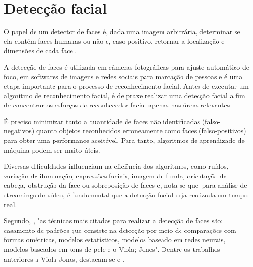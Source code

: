\chapter{Detecção facial}\label{cap:detecao_facial}


O papel de um detector de faces é, dada uma imagem arbitrária, determinar se ela contém faces humanas ou não e, caso positivo, retornar a localização e dimensões de cada face \cite{censtudy}.

A detecção de faces é utilizada em câmeras fotográficas para ajuste automático de foco, em softwares de imagens e redes sociais para marcação de pessoas e é uma etapa importante para o processo de reconhecimento facial. Antes de executar um algoritmo de reconhecimento facial, é de praxe realizar uma detecção facial a fim de concentrar os esforços do reconhecedor facial apenas nas áreas relevantes.

É preciso minimizar tanto a quantidade de faces não identificadas (falso-negativos) quanto objetos reconhecidos erroneamente como faces (falso-positivos) para obter uma performance aceitável. Para tanto, algoritmos de aprendizado de máquina podem ser muito úteis.

Diversas dificuldades influenciam na eficiência dos algoritmos, como ruídos, variação de iluminação, expressões faciais, imagem de fundo, orientação da cabeça, obstrução da face ou sobreposição de faces \cite{de2015processo} e, nota-se que, para análise de streamings de vídeo, é fundamental que a detecção facial seja realizada em tempo real.

Segundo, , "as técnicas mais citadas para realizar a detecção de faces são: casamento de padrões que consiste na detecção por meio de comparações com formas ométricas, modelos estatísticos, modelos baseado em redes neurais, modelos baseados em tons de pele e o Viola; Jones". Dentre os trabalhos anteriores a Viola-Jones, destacam-se  e .
